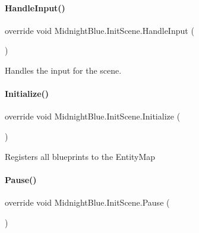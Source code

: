 \hypertarget{class_midnight_blue_1_1_init_scene_a4a8d9c22193d334e41685ce62fa11dd9}{}\label{class_midnight_blue_1_1_init_scene_a4a8d9c22193d334e41685ce62fa11dd9} 
\paragraph{\texorpdfstring{Handle\+Input()}{HandleInput()}}
{\footnotesize\ttfamily override void Midnight\+Blue.\+Init\+Scene.\+Handle\+Input (\begin{DoxyParamCaption}{ }\end{DoxyParamCaption})\hspace{0.3cm}{\ttfamily [inline]}}



Handles the input for the scene. 

\hypertarget{class_midnight_blue_1_1_init_scene_a99eee8cc5dab8d7263591aeaa50144fb}{}\label{class_midnight_blue_1_1_init_scene_a99eee8cc5dab8d7263591aeaa50144fb} 
\paragraph{\texorpdfstring{Initialize()}{Initialize()}}
{\footnotesize\ttfamily override void Midnight\+Blue.\+Init\+Scene.\+Initialize (\begin{DoxyParamCaption}{ }\end{DoxyParamCaption})\hspace{0.3cm}{\ttfamily [inline]}}



Registers all blueprints to the Entity\+Map 

\hypertarget{class_midnight_blue_1_1_init_scene_adbcab013e715e5c49ad09bcd0545d994}{}\label{class_midnight_blue_1_1_init_scene_adbcab013e715e5c49ad09bcd0545d994} 
\paragraph{\texorpdfstring{Pause()}{Pause()}}
{\footnotesize\ttfamily override void Midnight\+Blue.\+Init\+Scene.\+Pause (\begin{DoxyParamCaption}{ }\end{DoxyParamCaption})\hspace{0.3cm}{\ttfamily [inline]}}



